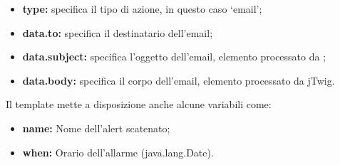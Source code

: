 	\begin{itemize}
                \item \textbf{type:} specifica il tipo di azione, in questo caso `email';
                \item \textbf{data.to:} specifica il destinatario dell'email;
                \item \textbf{data.subject:} specifica l'oggetto dell'email, elemento processato da ;
                \item \textbf{data.body:} specifica il corpo dell'email, elemento processato da jTwig.
	\end{itemize}

	Il template mette a disposizione anche alcune variabili come:

	\begin{itemize}
                \item \textbf{name:} Nome dell'alert scatenato;
                \item \textbf{when:} Orario dell'allarme (java.lang.Date).
	\end{itemize}
